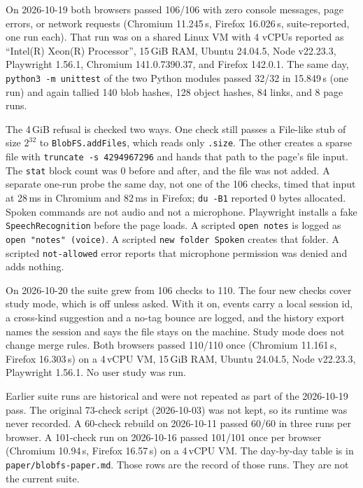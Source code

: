 \documentclass[11pt]{article}
\begin{document}
On 2026-10-19 both browsers passed 106/106 with zero console messages, page errors, or network requests (Chromium 11.245\,s, Firefox 16.026\,s, suite-reported, one run each).
That run was on a shared Linux VM with 4 vCPUs reported as ``Intel(R) Xeon(R) Processor'', 15\,GiB RAM, Ubuntu 24.04.5, Node v22.23.3, Playwright 1.56.1, Chromium 141.0.7390.37, and Firefox 142.0.1.
The same day, \texttt{python3 -m unittest} of the two Python modules passed 32/32 in 15.849\,s (one run) and again tallied 140 blob hashes, 128 object hashes, 84 links, and 8 page runs.

The 4\,GiB refusal is checked two ways.
One check still passes a File-like stub of size $2^{32}$ to \texttt{BlobFS.addFiles}, which reads only \texttt{.size}.
The other creates a sparse file with \texttt{truncate -s 4294967296} and hands that path to the page's file input.
The \texttt{stat} block count was 0 before and after, and the file was not added.
A separate one-run probe the same day, not one of the 106 checks, timed that input at 28\,ms in Chromium and 82\,ms in Firefox; \texttt{du -B1} reported 0 bytes allocated.
Spoken commands are not audio and not a microphone.
Playwright installs a fake \texttt{SpeechRecognition} before the page loads.
A scripted \texttt{open notes} is logged as \texttt{open "notes" (voice)}.
A scripted \texttt{new folder Spoken} creates that folder.
A scripted \texttt{not-allowed} error reports that microphone permission was denied and adds nothing.

On 2026-10-20 the suite grew from 106 checks to 110.
The four new checks cover study mode, which is off unless asked.
With it on, events carry a local session id, a cross-kind suggestion and a no-tag bounce are logged, and the history export names the session and says the file stays on the machine.
Study mode does not change merge rules.
Both browsers passed 110/110 once (Chromium 11.161\,s, Firefox 16.303\,s) on a 4\,vCPU VM, 15\,GiB RAM, Ubuntu 24.04.5, Node v22.23.3, Playwright 1.56.1.
No user study was run.

Earlier suite runs are historical and were not repeated as part of the 2026-10-19 pass.
The original 73-check script (2026-10-03) was not kept, so its runtime was never recorded.
A 60-check rebuild on 2026-10-11 passed 60/60 in three runs per browser.
A 101-check run on 2026-10-16 passed 101/101 once per browser (Chromium 10.94\,s, Firefox 16.57\,s) on a 4\,vCPU VM.
The day-by-day table is in \texttt{paper/blobfs-paper.md}.
Those rows are the record of those runs.
They are not the current suite.
\end{document}
